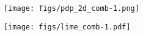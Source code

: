 \documentclass[12pt]{article}
\begin{document}
\begin{figure}[h!]
  \centering
  \texttt{[image: figs/pdp\_2d\_comb-1.png]}
  \caption{
  }
  \label{fig:2d}
\end{figure}


\begin{figure}[h!]
\centering
  \texttt{[image: figs/lime\_comb-1.pdf]}
\caption{
\protect\label{fig:limegp}}
\end{figure}
\end{document}
